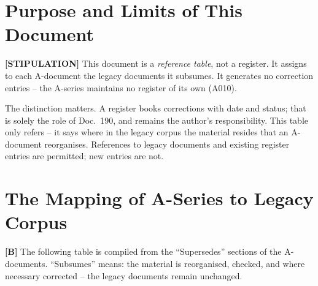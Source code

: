 \section{Purpose and Limits of This Document}

\textbf{[STIPULATION]} This document is a \emph{reference table}, not a register.
It assigns to each A-document the legacy documents it subsumes. It generates no
correction entries -- the A-series maintains no register of its own (A010).

The distinction matters. A register books corrections with date and status; that
is solely the role of Doc.~190, and remains the author's responsibility. This
table only refers -- it says where in the legacy corpus the material resides that
an A-document reorganises. References to legacy documents and existing register
entries are permitted; new entries are not.

\section{The Mapping of A-Series to Legacy Corpus}

\textbf{[B]} The following table is compiled from the ``Supersedes'' sections of
the A-documents. ``Subsumes'' means: the material is reorganised, checked, and
where necessary corrected -- the legacy documents remain unchanged.

